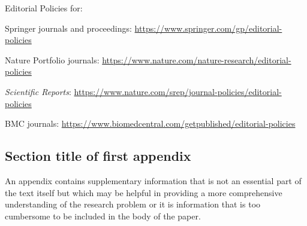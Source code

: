 \documentclass[pdflatex,sn-mathphys-num]{sn-jnl}%
\theoremstyle{thmstyleone}%
\theoremstyle{thmstyletwo}%
\theoremstyle{thmstylethree}%
\begin{document}
\bigskip
\begin{flushleft}%
Editorial Policies for:

\bigskip\noindent
Springer journals and proceedings: \url{https://www.springer.com/gp/editorial-policies}

\bigskip\noindent
Nature Portfolio journals: \url{https://www.nature.com/nature-research/editorial-policies}

\bigskip\noindent
\textit{Scientific Reports}: \url{https://www.nature.com/srep/journal-policies/editorial-policies}

\bigskip\noindent
BMC journals: \url{https://www.biomedcentral.com/getpublished/editorial-policies}
\end{flushleft}

\begin{appendices}

\section{Section title of first appendix}\label{secA1}

An appendix contains supplementary information that is not an essential part of the text itself but which may be helpful in providing a more comprehensive understanding of the research problem or it is information that is too cumbersome to be included in the body of the paper.




\end{appendices}
\end{document}
